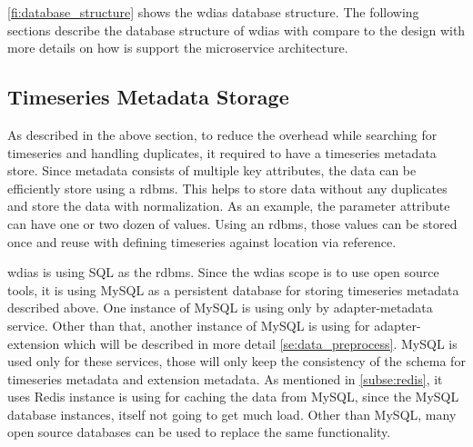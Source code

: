 
\cref{fi:database_structure} shows the \acrshort{wdias} database structure.
The following sections describe the database structure of \acrshort{wdias} with compare to the design with more details on how is support the microservice architecture.

\subsection{Timeseries Metadata Storage}
\label{subse:mysql}

As described in the above section, to reduce the overhead while searching for timeseries and handling duplicates, it required to have a timeseries metadata store. Since metadata consists of multiple key attributes, the data can be efficiently store using a \acrfull{rdbms}. This helps to store data without any duplicates and store the data with normalization. As an example, the parameter attribute can have one or two dozen of values. Using an \acrshort{rdbms}, those values can be stored once and reuse with defining timeseries against location via reference.

\acrshort{wdias} is using SQL as the \acrfull{rdbms}. 
Since the \acrshort{wdias} scope is to use open source tools, it is using  MySQL as a persistent database for storing timeseries metadata described above.
One instance of  MySQL is using only by adapter-metadata service.
Other than that, another instance of  MySQL is using for adapter-extension which will be described in more detail \cref{se:data_preprocess}.
 MySQL is used only for these services, those will only keep the consistency of the schema for timeseries metadata and extension metadata.
As mentioned in \cref{subse:redis}, it uses  Redis instance is using for caching the data from  MySQL, since the  MySQL database instances, itself not going to get much load.
Other than MySQL, many open source databases can be used to replace the same functionality.

